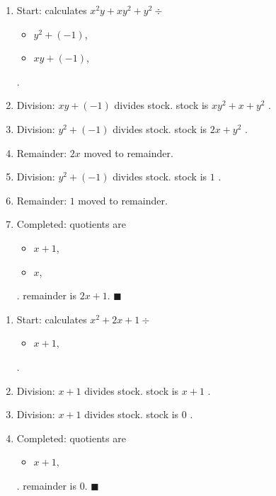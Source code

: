 \documentclass{jsarticle}
\begin{document}
\begin{enumerate}
\item Start: calculates $x^2y+xy^2+y^2\div $\begin{itemize}
\item $y^2+(-1)$, 
\item $xy+(-1)$, 
\end{itemize} .  

\item Division: $xy+(-1)$ divides stock. stock is $xy^2+x+y^2$ .  
\item Division: $y^2+(-1)$ divides stock. stock is $2x+y^2$ .  
\item Remainder: $2x$ moved to remainder.  
\item Division: $y^2+(-1)$ divides stock. stock is $1$ .  
\item Remainder: $1$ moved to remainder.  
\item Completed: quotients are \begin{itemize}
\item $x+1$, 
\item $x$, 
\end{itemize} .  
remainder is $2x+1$.  $\blacksquare$
\end{enumerate}
\begin{enumerate}
\item Start: calculates $x^2+2x+1\div $\begin{itemize}
\item $x+1$, 
\end{itemize} .  

\item Division: $x+1$ divides stock. stock is $x+1$ .  
\item Division: $x+1$ divides stock. stock is $0$ .  
\item Completed: quotients are \begin{itemize}
\item $x+1$, 
\end{itemize} .  
remainder is $0$.  $\blacksquare$
\end{enumerate}
\end{document}

